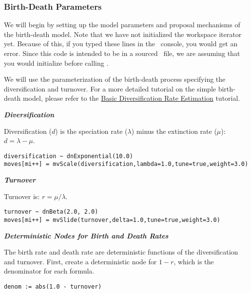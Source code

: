 \subsubsection{Birth-Death Parameters}

We will begin by setting up the model parameters and proposal mechanisms of the birth-death model. 
Note that we have not initialized the workspace iterator  yet. 
Because of this, if you typed these lines in the \RevBayes~console, you would get an error. 
Since this code is intended to be in a sourced \Rev~file, we are assuming that you would initialize  before calling .

We will use the parameterization of the birth-death process specifying the diversification and turnover.
For a more detailed tutorial on the simple birth-death model, please refer to the \href{https://github.com/revbayes/revbayes_tutorial/blob/master/tutorial_TeX/RB_DiversificationRate_Tutorial/RB_DiversificationRate_Tutorial.pdf}{Basic Diversification Rate Estimation} tutorial.

\textbf{\textit{Diversification}}

Diversification ($d$) is the speciation rate ($\lambda$) minus the extinction rate ($\mu$): $d = \lambda - \mu$.
{\tt \begin{snugshade*}
\begin{lstlisting}
diversification ~ dnExponential(10.0) 
moves[mi++] = mvScale(diversification,lambda=1.0,tune=true,weight=3.0)
\end{lstlisting}
\end{snugshade*}}

\textbf{\textit{Turnover}}

Turnover is: $r = \mu / \lambda$.
{\tt \begin{snugshade*}
\begin{lstlisting}
turnover ~ dnBeta(2.0, 2.0) 
moves[mi++] = mvSlide(turnover,delta=1.0,tune=true,weight=3.0)
\end{lstlisting}
\end{snugshade*}}

\textbf{\textit{Deterministic Nodes for Birth and Death Rates}}

The birth rate and death rate are deterministic functions of the diversification and turnover.
First, create a deterministic node for $1 - r$, which is the denominator for each formula.

{\tt \begin{snugshade*}
\begin{lstlisting}
denom := abs(1.0 - turnover) 
\end{lstlisting}
\end{snugshade*}}

